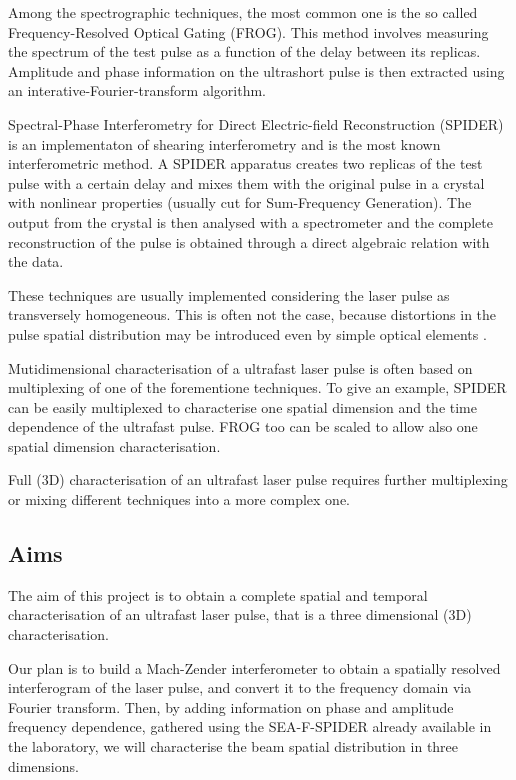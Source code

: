 \documentclass[12pt,a4paper,twoside]{article}
\begin{document}
Among the spectrographic techniques, the most common one is the so called Frequency-Resolved Optical Gating (FROG).
This method involves measuring the spectrum of the test pulse as a function of the delay between its replicas.
Amplitude and phase information on the ultrashort pulse is then extracted using an interative-Fourier-transform algorithm.

Spectral-Phase Interferometry for Direct Electric-field Reconstruction (SPIDER) is an implementaton of shearing interferometry and is the most known interferometric method.
A SPIDER apparatus creates two replicas of the test pulse with a certain delay and mixes them with the original pulse in a crystal with nonlinear properties (usually cut for Sum-Frequency Generation).
The output from the crystal is then analysed with a spectrometer and the complete reconstruction of the pulse is obtained through a direct algebraic relation with the data.

These techniques are usually implemented considering the laser pulse as transversely homogeneous.
This is often not the case, because distortions in the pulse spatial distribution may be introduced even by simple optical elements \cite{bor}.

Mutidimensional characterisation of a ultrafast laser pulse is often based on multiplexing of one of the forementione techniques.
To give an example, SPIDER can be easily multiplexed to characterise one spatial dimension and the time dependence of the ultrafast pulse.
FROG too can be scaled to allow also one spatial dimension characterisation.

Full (3D) characterisation of an ultrafast laser pulse requires further multiplexing or mixing different techniques into a more complex one.

\subsection{Aims}
The aim of this project is to obtain a complete spatial and temporal characterisation of an ultrafast laser pulse, that is a three dimensional (3D) characterisation.

Our plan is to build a Mach-Zender interferometer to obtain a spatially resolved interferogram of the laser pulse, and convert it to the frequency domain via Fourier transform.
Then, by adding information on phase and amplitude frequency dependence, gathered using the SEA-F-SPIDER already available in the laboratory, we will characterise the beam spatial distribution in three dimensions.
\end{document}
